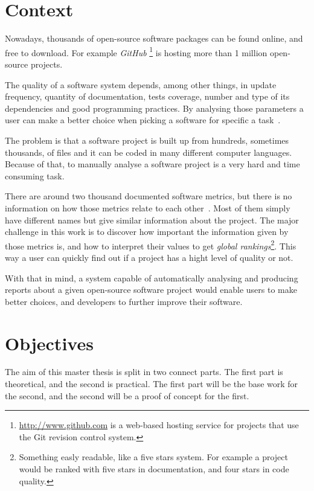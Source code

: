 \documentclass[12pt]{article}
\begin{document}

\section{Context}
Nowadays, thousands of open-source software packages can be found online, and free to download. For example \textit{GitHub} \footnote{\url{http://www.github.com} is a web-based hosting service for projects that use the Git revision control system.} is hosting more than 1 million open-source projects.

The quality of a software system \cite{gousios2007software} depends, among other things, in update frequency, quantity of documentation, tests coverage, number and type of its dependencies and good programming practices. By analysing those parameters a user can make a better choice when picking a software for specific a task~\cite{marchenko2007predicting}.

The problem is that a software project is built up from hundreds, sometimes thousands, of files and it can be coded in many different computer languages. Because of that, to manually analyse a software project is a very hard and time consuming task.

There are around two thousand documented software metrics, but there is no information on how those metrics relate to each other~\cite{kan2002metrics}. 
Most of them simply have different names but give similar information about the project. The major challenge in this work is to discover how important the information given by those metrics is, and how to interpret their values to get \textit{global rankings}\footnote{Something easly readable, like a five stars system. For example a project would be ranked with five stars in documentation, and four stars in code quality. }. This way a user can quickly find out if a project has a hight level of quality or not.

With that in mind, a system capable of automatically analysing and producing reports \cite{hofer2010evaluating} about a given open-source software project would enable users to make better choices, and developers to further improve their software.


\section{Objectives}
The aim of this master thesis is split in two connect parts. The first part is theoretical, and the second is practical. The first part will be the base work for the second, and the second will be a proof of concept for the first.
\end{document}

